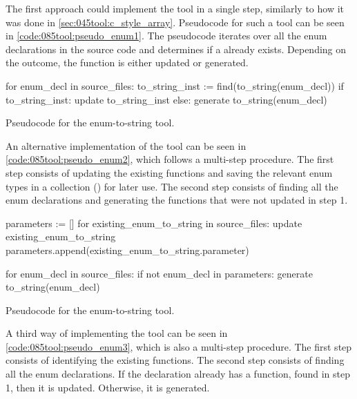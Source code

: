 The first approach could implement the tool in a single step, similarly to how it was done in \cref{sec:045tool:c_style_array}. Pseudocode for such a tool can be seen in \cref{code:085tool:pseudo_enum1}. The pseudocode iterates over all the enum declarations in the source code and determines if a  already exists. Depending on the outcome, the function is either updated or generated.

\begin{listing}[H]
    \begin{pythoncode}
for enum_decl in source_files:
    to_string_inst := find(to_string(enum_decl))
    if to_string_inst:
        update to_string_inst
    else:
        generate to_string(enum_decl)
    \end{pythoncode}
    \caption{Pseudocode for the enum-to-string tool.}
    \label{code:085tool:pseudo_enum1}
\end{listing}

An alternative implementation of the tool can be seen in \cref{code:085tool:pseudo_enum2}, which follows a multi-step procedure. The first step consists of updating the existing  functions and saving the relevant enum types in a collection () for later use. The second step consists of finding all the enum declarations and generating the  functions that were not updated in step 1.

\begin{listing}[H]
    \begin{pythoncode}
parameters := []
for existing_enum_to_string in source_files:
    update existing_enum_to_string
    parameters.append(existing_enum_to_string.parameter)

for enum_decl in source_files:
    if not enum_decl in parameters:
        generate to_string(enum_decl)
    \end{pythoncode}
    \caption{Pseudocode for the enum-to-string tool.}
    \label{code:085tool:pseudo_enum2}
\end{listing}

A third way of implementing the tool can be seen in \cref{code:085tool:pseudo_enum3}, which is also a multi-step procedure. The first step consists of identifying the existing  functions. The second step consists of finding all the enum declarations. If the declaration already has a  function, found in step 1, then it is updated. Otherwise, it is generated.


